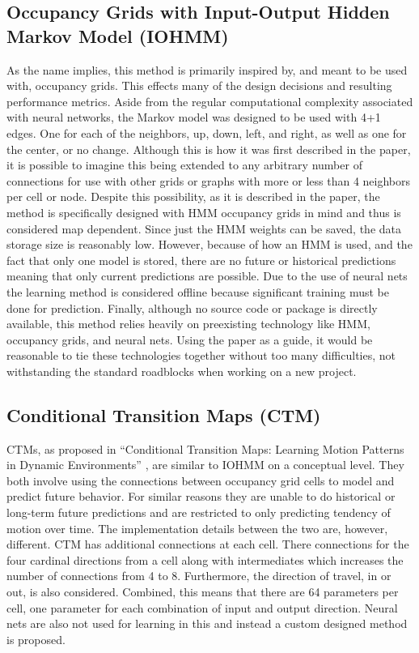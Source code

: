   \subsection { Occupancy Grids with Input-Output Hidden Markov Model (IOHMM) \cite{Wang2015}}
  As the name implies, this method is primarily inspired by, and meant to be
  used with, occupancy grids. This effects many of the design decisions and
  resulting performance metrics. Aside from the regular computational complexity
  associated with neural networks, the Markov model was designed to be
  used with 4+1 edges. One for each of the neighbors, up, down, left, and right,
  as well as one for the center, or no change. Although this is how it was first
  described in the paper, it is possible to imagine this being extended to any
  arbitrary number of connections for use with other grids or graphs with more
  or less than 4 neighbors per cell or node. Despite this possibility, as it is
  described in the paper, the method is specifically designed with HMM occupancy
  grids in mind and thus is considered map dependent. Since just the HMM weights can
  be saved, the data storage size is reasonably low. However, because of how an HMM is used,
  and the fact that only one model is stored, there are no future or historical predictions meaning that
  only current predictions are possible. Due to the use of neural nets
  the learning method is considered offline because significant training must be
  done for prediction. Finally, although no source code or package is directly
  available, this method relies heavily on preexisting technology like HMM,
  occupancy grids, and neural nets. Using the paper as a guide, it would be
  reasonable to tie these technologies together without too many difficulties,
  not withstanding the standard roadblocks when working on a new project. \\

  \subsection { Conditional Transition Maps (CTM) \cite{Kucner2013}}
  CTMs, as proposed in ``Conditional Transition Maps: Learning Motion Patterns
  in Dynamic Environments'' \cite{Kucner2013}, are similar to IOHMM on a conceptual
  level. They both involve using the connections between occupancy grid cells
  to model and predict future behavior. For similar reasons they are unable to
  do historical or long-term future predictions and are restricted to only
  predicting tendency of motion over time. The implementation details between
  the two are, however, different. CTM has additional connections at each cell.
  There connections for the four cardinal directions from a cell
  along with intermediates which increases the number of connections
  from 4 to 8. Furthermore, the direction of travel, in or out, is also
  considered. Combined, this means that there are 64 parameters per cell, one
  parameter for each combination of input and output direction. Neural nets
  are also not used for learning in this and instead a custom designed
  method is proposed. \\

